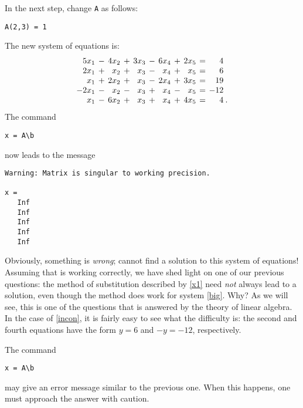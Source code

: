 \documentclass{ximera}
\begin{document}
In the next step, change {\tt A} as follows:
\begin{verbatim}
A(2,3) = 1
\end{verbatim}
The new system of equations is:
\begin{equation}  \label{incon}
\arraycolsep 2pt
\begin{array}{rcrcrcrcrcrl}
 5x_1 & - & 4x_2 & + & 3x_3 & - &  6x_4 & + & 2x_5 & = &   4  & \\
 2x_1 & + &  x_2 & + &  x_3 & - &   x_4 & + &  x_5 & = &   6  & \\
  x_1 & + & 2x_2 & + &  x_3 & - &  2x_4 & + & 3x_5 & = &  19  & \\
-2x_1 & - &  x_2 & - &  x_3 & + &   x_4 & - &  x_5 & = & -12  & \\
  x_1 & - & 6x_2 & + &  x_3 & + &   x_4 & + & 4x_5 & = &   4  & \!
.
\end{array}
\end{equation}
The command
\begin{verbatim}
x = A\b
\end{verbatim}  \index{\computer!$\backslash$}
now leads to the message
\begin{verbatim}
Warning: Matrix is singular to working precision.

x =
   Inf
   Inf
   Inf
   Inf
   Inf
\end{verbatim}  
Obviously, something is {\em wrong\/}; \Matlab cannot find a
solution to this system of equations!  Assuming that \Matlab is
working correctly, we have shed light on one of our previous
questions: the method of substitution described by \eqref{x1} need
{\em not\/} always lead to a solution, even though the method
does work for system \eqref{big}.  Why?  As we will see, this is
one of the questions that is answered by the theory of linear
algebra.  In the case of \eqref{incon}, it is fairly easy to see
what the difficulty is: the second and fourth equations
have the form $y=6$ and $-y=-12$, respectively.

\vspace{0.1in}

  The \Matlab command
\begin{verbatim}
x = A\b
\end{verbatim}
may give an error message similar to the previous one.  When
this happens, one must approach the answer with caution.



\end{document}
